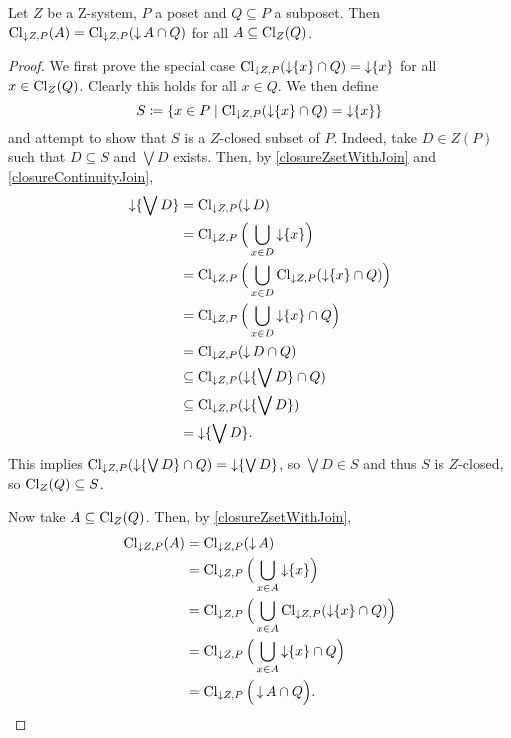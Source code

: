 \begin{lemma} \label{closureSetInClosureIsClosureOfPartInSet}
Let $Z$ be a $\mathrm{Z}$-system, $P$ a poset and $Q \subseteq P$ a subposet. Then $\operatorname{Cl}_{\downarrow Z, P}(A) = \operatorname{Cl}_{\downarrow Z, P}(\operatorname{\downarrow} A \cap Q)$ for all $A\subseteq \operatorname{Cl}_{Z}(Q)$.
\end{lemma}
\begin{proof}
We first prove the special case $\operatorname{Cl}_{\downarrow Z, P}(\operatorname{\downarrow} \{x\} \cap Q) = \operatorname{\downarrow} \{x\}$ for all $x\in \operatorname{Cl}_Z(Q)$. Clearly this holds for all $x\in Q$. We then define
\[ S \defeq \setbuilder{x\in P}{\Closure_{\downarrow Z, P}(\downset \{x\} \cap Q) = \downset \{x\}} \]
and attempt to show that $S$ is a $Z$-closed subset of $P$. Indeed, take $D\in Z(P)$ such that $D\subseteq S$ and $\bigvee D$ exists. Then, by \ref{closureZsetWithJoin} and \ref{closureContinuityJoin},
\begin{align*}
\operatorname{\downarrow} \{\bigvee D\} &= \operatorname{Cl}_{\downarrow Z, P}(\operatorname{\downarrow} D) \\
&= \operatorname{Cl}_{\downarrow Z, P}\Big(\bigcup_{x\in D} \operatorname{\downarrow} \{x\}\Big) \\
&= \operatorname{Cl}_{\downarrow Z, P}\Big(\bigcup_{x\in D} \operatorname{Cl}_{\downarrow Z, P}(\operatorname{\downarrow} \{x\} \cap Q)\Big) \\
&= \operatorname{Cl}_{\downarrow Z, P}\Big(\bigcup_{x\in D}\operatorname{\downarrow} \{x\} \cap Q \Big) \\
&= \operatorname{Cl}_{\downarrow Z, P}(\operatorname{\downarrow} D \cap Q ) \\
&\subseteq \operatorname{Cl}_{\downarrow Z, P}(\operatorname{\downarrow} \{\bigvee D\} \cap Q ) \\
&\subseteq \operatorname{Cl}_{\downarrow Z, P}(\operatorname{\downarrow} \{\bigvee D\}) \\
&= \operatorname{\downarrow} \{\bigvee D\}.
\end{align*}
This implies $\operatorname{Cl}_{\downarrow Z, P}(\operatorname{\downarrow} \{\bigvee D\} \cap Q ) = \operatorname{\downarrow} \{\bigvee D\}$, so $\bigvee D\in S$ and thus $S$ is $Z$-closed, so $\operatorname{Cl}_Z(Q) \subseteq S$.

Now take $A\subseteq \operatorname{Cl}_Z(Q)$. Then, by \ref{closureZsetWithJoin},
\begin{align*}
\operatorname{Cl}_{\downarrow Z, P}(A) &= \operatorname{Cl}_{\downarrow Z, P}(\operatorname{\downarrow} A) \\
&= \operatorname{Cl}_{\downarrow Z, P}\Big(\bigcup_{x\in A} \operatorname{\downarrow} \{x\}\Big) \\
&= \operatorname{Cl}_{\downarrow Z, P}\Big(\bigcup_{x\in A} \operatorname{Cl}_{\downarrow Z, P}(\operatorname{\downarrow} \{x\} \cap Q)\Big) \\
&= \operatorname{Cl}_{\downarrow Z, P}\Big(\bigcup_{x\in A} \operatorname{\downarrow} \{x\} \cap Q\Big) \\
&= \operatorname{Cl}_{\downarrow Z, P}\Big(\operatorname{\downarrow} A \cap Q\Big).
\end{align*}
\end{proof}

